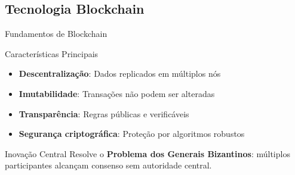 \documentclass{libs/ufc_format}
\begin{document}
\subsection{Tecnologia Blockchain}
\begin{frame}{Fundamentos de Blockchain}
    \begin{block}{Características Principais}
        \begin{itemize}
            \item \textbf{Descentralização}: Dados replicados em múltiplos nós
            \item \textbf{Imutabilidade}: Transações não podem ser alteradas
            \item \textbf{Transparência}: Regras públicas e verificáveis
            \item \textbf{Segurança criptográfica}: Proteção por algoritmos robustos
        \end{itemize}
    \end{block}
    
    \vspace{0.3cm}
    
    \begin{alertblock}{Inovação Central}
        Resolve o \textbf{Problema dos Generais Bizantinos}: múltiplos participantes alcançam consenso sem autoridade central.
    \end{alertblock}
\end{frame}
\end{document}
